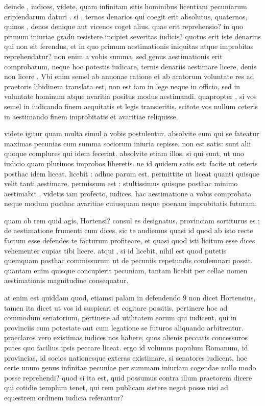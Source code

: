  deinde , iudices, videte, quam infinitam sitis hominibus licentiam pecuniarum eripiendarum daturi . si , ternos denarios qui coegit erit absolutus, quaternos, quinos , denos denique aut vicenos coget alius. quae erit reprehensio? in quo primum iniuriae gradu resistere incipiet severitas iudicis? quotus erit iste denarius qui non sit ferendus, et in quo primum aestimationis iniquitas atque improbitas reprehendatur? non enim a vobis summa, sed genus aestimationis erit comprobatum, neque hoc potestis iudicare, ternis denariis aestimare licere, denis non licere . Vbi enim semel ab annonae ratione et ab aratorum voluntate res ad praetoris libidinem translata est, non est iam in lege neque in officio, sed in voluntate hominum atque avaritia positus modus aestimandi. quapropter , si vos semel in iudicando finem aequitatis et legis transieritis, scitote vos nullum ceteris in aestimando finem improbitatis et avaritiae reliquisse.

 videte igitur quam multa simul a vobis postulentur. absolvite eum qui se fateatur maximas pecunias cum summa sociorum iniuria cepisse. non est satis: sunt alii quoque complures qui idem fecerint. absolvite etiam illos, si qui sunt, ut uno iudicio quam plurimos improbos liberetis. ne id quidem satis est: facite ut ceteris posthac idem liceat. licebit : adhuc parum est. permittite ut liceat quanti quisque velit tanti aestimare. permissum est : stultissimus quisque posthac minimo aestimabit . videtis iam profecto, iudices, hac aestimatione a vobis comprobata neque modum posthac avaritiae cuiusquam neque poenam improbitatis futuram.

 quam ob rem quid agis, Hortensi? consul es designatus, provinciam sortiturus es ; de aestimatione frumenti cum dices, sic te audiemus quasi id quod ab isto recte factum esse defendes te facturum profiteare, et quasi quod isti licitum esse dices vehementer cupias tibi licere. atqui , si id licebit, nihil est quod putetis quemquam posthac commissurum ut de pecuniis repetundis condemnari possit. quantam enim quisque concupierit pecuniam, tantam licebit per cellae nomen aestimationis magnitudine consequatur.

 at enim est quiddam quod, etiamsi palam in defendendo 9 non dicet Hortensius, tamen ita dicet ut vos id suspicari et cogitare possitis, pertinere hoc ad commodum senatorium, pertinere ad utilitatem eorum qui iudicent, qui in provinciis cum potestate aut cum legatione se futuros aliquando arbitrentur. praeclaros vero existimas iudices nos habere, quos alienis peccatis concessuros putes quo facilius ipsis peccare liceat. ergo id volumus populum Romanum, id provincias, id socios nationesque exteras existimare, si senatores iudicent, hoc certe unum genus infinitae pecuniae per summam iniuriam cogendae nullo modo posse reprehendi? quod si ita est, quid possumus contra illum praetorem dicere qui cotidie templum tenet, qui rem publicam sistere negat posse nisi ad equestrem ordinem iudicia referantur?

